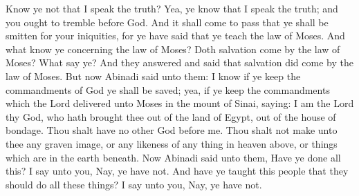 Know ye not that I speak the truth? Yea, ye know that I speak the truth; and you ought to tremble before God.
\bverse \iffalse And it shall come to pass that ye shall be smitten for your iniquities, for ye have said that ye teach the law of Moses. And what know ye concerning the law of Moses? Doth salvation come by the law of Moses? What say ye? \fi
And it shall come to pass that ye shall be smitten for your iniquities, for ye have said that ye teach the law of Moses. And what know ye concerning the law of Moses? Doth salvation come by the law of Moses? What say ye?
\bverse \iffalse And they answered and said that salvation did come by the law of Moses. \fi
And they answered and said that salvation did come by the law of Moses.
\bverse \iffalse But now Abinadi said unto them: I know if ye keep the commandments of God ye shall be saved; yea, if ye keep the commandments which the Lord delivered unto Moses in the mount of Sinai, saying: \fi
But now Abinadi said unto them: I know if ye keep the commandments of God ye shall be saved; yea, if ye keep the commandments which the Lord delivered unto Moses in the mount of Sinai, saying:
\bverse \iffalse I am the Lord thy God, who hath brought thee out of the land of Egypt, out of the house of bondage. \fi
I am the Lord thy God, who hath brought thee out of the land of Egypt, out of the house of bondage.
\bverse \iffalse Thou shalt have no other God before me. \fi
Thou shalt have no other God before me.
\bverse \iffalse Thou shalt not make unto thee any graven image, or any likeness of any thing in heaven above, or things which are in the earth beneath. \fi
Thou shalt not make unto thee any graven image, or any likeness of any thing in heaven above, or things which are in the earth beneath.
\bverse \iffalse Now Abinadi said unto them, Have ye done all this? I say unto you, Nay, ye have not. And have ye taught this people that they should do all these things? I say unto you, Nay, ye have not. \fi
Now Abinadi said unto them, Have ye done all this? I say unto you, Nay, ye have not. And have ye taught this people that they should do all these things? I say unto you, Nay, ye have not.

